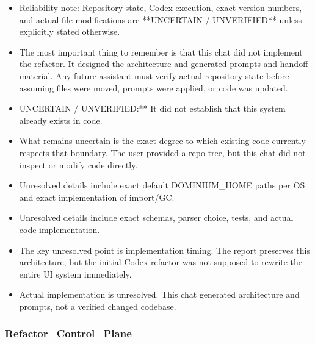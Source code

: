 \documentclass[11pt,a4paper]{report}
\begin{document}
\begin{itemize}
\item Reliability note: Repository state, Codex execution, exact version numbers, and actual file modifications are **UNCERTAIN / UNVERIFIED** unless explicitly stated otherwise.
\item The most important thing to remember is that this chat did not implement the refactor. It designed the architecture and generated prompts and handoff material. Any future assistant must verify actual repository state before assuming files were moved, prompts were applied, or code was updated.
\item UNCERTAIN / UNVERIFIED:** It did not establish that this system already exists in code.
\item What remains uncertain is the exact degree to which existing code currently respects that boundary. The user provided a repo tree, but this chat did not inspect or modify code directly.
\item Unresolved details include exact default DOMINIUM\_HOME paths per OS and exact implementation of import/GC.
\item Unresolved details include exact schemas, parser choice, tests, and actual code implementation.
\item The key unresolved point is implementation timing. The report preserves this architecture, but the initial Codex refactor was not supposed to rewrite the entire UI system immediately.
\item Actual implementation is unresolved. This chat generated architecture and prompts, not a verified changed codebase.
\end{itemize}

\subsubsection{Refactor\_Control\_Plane}
\end{document}
